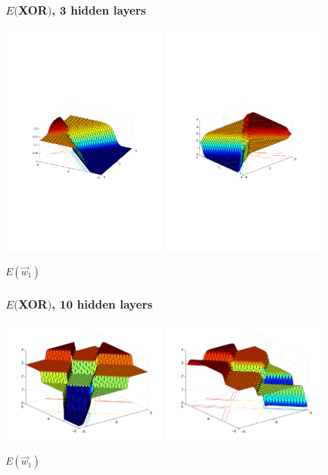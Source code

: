 \documentclass[USenglish,pdftex,compress,10pt,svgnamesi,handout]{beamer}
\begin{document}
\begin{frame}
\frametitle{$E($XOR$)$, 3 hidden layers}
\includegraphics[width=6cm]{pics/xor_in1_3hidden}
\includegraphics[width=6cm]{pics/xor_in2_3hidden}

$E(\Vec w_1)$
\end{frame}


\begin{frame}
\frametitle{$E($XOR$)$, 10 hidden layers}
\includegraphics[width=6cm]{pics/xor_in1_10hidden}
\includegraphics[width=6cm]{pics/xor_in2_10hidden}

$E(\Vec w_1)$
\end{frame}
\end{document}
